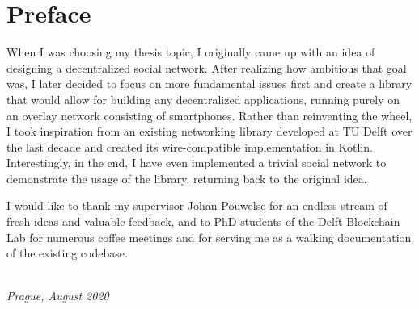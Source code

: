 \chapter*{Preface}

When I was choosing my thesis topic, I originally came up with an idea of designing a decentralized social network. After realizing how ambitious that goal was, I later decided to focus on more fundamental issues first and create a library that would allow for building any decentralized applications, running purely on an overlay network consisting of smartphones. Rather than reinventing the wheel, I took inspiration from an existing networking library developed at TU Delft over the last decade and created its wire-compatible implementation in Kotlin. Interestingly, in the end, I have even implemented a trivial social network to demonstrate the usage of the library, returning back to the original idea.

I would like to thank my supervisor Johan Pouwelse for an endless stream of fresh ideas and valuable feedback, and to PhD students of the Delft Blockchain Lab for numerous coffee meetings and for serving me as a walking documentation of the existing codebase.

\begin{flushright}
{\makeatletter\itshape
    \@author \\
    Prague, August 2020
\makeatother}
\end{flushright}

